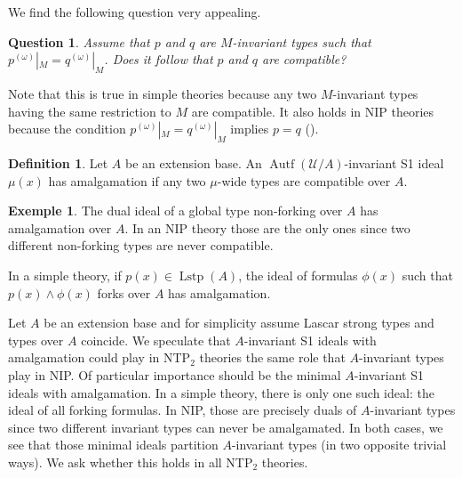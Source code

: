 \documentclass{amsart}
\numberwithin{equation}{section}
\newtheorem{question}[thm]{Question}
\theoremstyle{definition}
\newtheorem{defi}[thm]{Definition}
\theoremstyle{mystyle}
\newtheorem{ex}[thm]{Exemple}
\theoremstyle{remark}
\newcommand{\monster}{\mathcal U}
\DeclareMathOperator{\Lstp}{Lstp}
\DeclareMathOperator{\Autf}{Autf}
\begin{document}
We find the following question very appealing.

\begin{question}
Assume that $p$ and $q$ are $M$-invariant types such that $p^{(\omega)}|_M = q^{(\omega)}|_M$. Does it follow that $p$ and $q$ are compatible?
\end{question}

Note that this is true in simple theories because any two $M$-invariant types having the same restriction to $M$ are compatible. It also holds in NIP theories because the condition $p^{(\omega)}|_M = q^{(\omega)}|_M$ implies $p=q$ (\cite[Proposition 2.36]{NIPbook}).





\begin{defi}
Let $A$ be an extension base. An $\Autf(\monster/A)$-invariant S1 ideal $\mu(x)$ has amalgamation if any two $\mu$-wide types are compatible over $A$. 
\end{defi}

\begin{ex}
The dual ideal of a global type non-forking over $A$ has amalgamation over $A$. In an NIP theory those are the only ones since two different non-forking types are never compatible.

In a simple theory, if $p(x)\in \Lstp(A)$, the ideal of formulas $\phi(x)$ such that $p(x)\wedge \phi(x)$ forks over $A$ has amalgamation.
\end{ex}

Let $A$ be an extension base and for simplicity assume Lascar strong types and types over $ A$ coincide. We speculate that $A$-invariant S1 ideals with amalgamation could play in NTP$_2$ theories the same role that $A$-invariant types play in NIP. Of particular importance should be the minimal $A$-invariant S1 ideals with amalgamation. In a simple theory, there is only one such ideal: the ideal of all forking formulas. In NIP, those are precisely duals of $A$-invariant types since two different invariant types can never be amalgamated. In both cases, we see that those minimal ideals partition $A$-invariant types (in two opposite trivial ways). We ask whether this holds in all NTP$_2$ theories.
\end{document}
